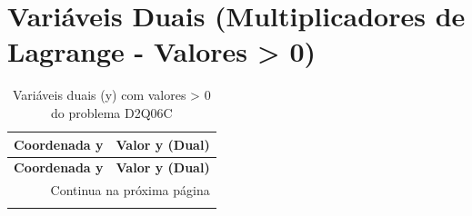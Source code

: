 \documentclass[12pt]{article}
\begin{document}
\section{Variáveis Duais (Multiplicadores de Lagrange - Valores > 0)}

\begin{longtable}{@{}cc@{}}
\caption{Variáveis duais (y) com valores > 0 do problema D2Q06C} \\
\toprule
\textbf{Coordenada y} & \textbf{Valor y (Dual)} \\
\midrule
\endfirsthead

\toprule
\textbf{Coordenada y} & \textbf{Valor y (Dual)} \\
\midrule
\endhead

\midrule \multicolumn{2}{r}{{Continua na próxima página}} \\ \midrule
\endfoot


\end{longtable}
\end{document}
